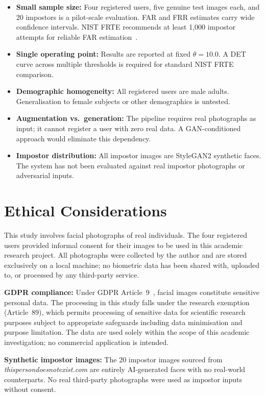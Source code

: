 \documentclass[conference]{IEEEtran}
\begin{document}
\begin{itemize}
    \item \textbf{Small sample size:} Four registered users, five genuine test images each, and 20 impostors is a pilot-scale evaluation. FAR and FRR estimates carry wide confidence intervals. NIST FRTE recommends at least 1,000 impostor attempts for reliable FAR estimation~\cite{nist_frte}.
    \item \textbf{Single operating point:} Results are reported at fixed $\theta\!=\!10.0$. A DET curve across multiple thresholds is required for standard NIST FRTE comparison.
    \item \textbf{Demographic homogeneity:} All registered users are male adults. Generalisation to female subjects or other demographics is untested.
    \item \textbf{Augmentation vs.\ generation:} The pipeline requires real photographs as input; it cannot register a user with zero real data. A GAN-conditioned approach would eliminate this dependency.
    \item \textbf{Impostor distribution:} All impostor images are StyleGAN2 synthetic faces. The system has not been evaluated against real impostor photographs or adversarial inputs.
\end{itemize}

\section{Ethical Considerations}

This study involves facial photographs of real individuals. The four registered users provided informal consent for their images to be used in this academic research project. All photographs were collected by the author and are stored exclusively on a local machine; no biometric data has been shared with, uploaded to, or processed by any third-party service.

\textbf{GDPR compliance:} Under GDPR Article~9~\cite{gdpr2016}, facial images constitute sensitive personal data. The processing in this study falls under the research exemption (Article~89), which permits processing of sensitive data for scientific research purposes subject to appropriate safeguards including data minimisation and purpose limitation. The data are used solely within the scope of this academic investigation; no commercial application is intended.

\textbf{Synthetic impostor images:} The 20 impostor images sourced from \textit{thispersondoesnotexist.com} are entirely AI-generated faces with no real-world counterparts. No real third-party photographs were used as impostor inputs without consent.
\end{document}
